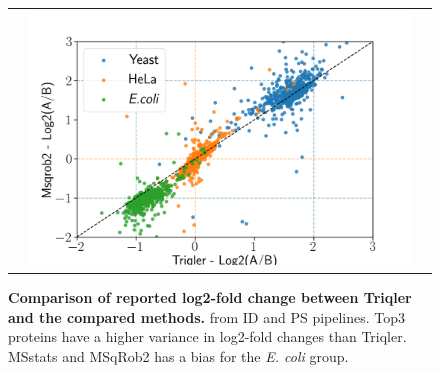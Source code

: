 \documentclass[11pt]{article}
\begin{document}
\begin{figure}[hbt]
\begin{tabular}{   >{\centering\arraybackslash} m{3cm} V V}
                & \includegraphics[width=\linewidth]{../../result/report_plots_pipeline/scatter_PS_triqler_vs_msqrob2.png} \\ 
    \end{tabular}
    \caption{{\bf Comparison of reported log2-fold change between Triqler and the compared methods.} from ID and PS pipelines. Top3 proteins have a higher variance in log2-fold changes than Triqler. MSstats and MSqRob2 has a bias for the \textit{E. coli} group. \label{fig:fc_scatter_triqler_vs_method_supplement}}
   
\end{figure}
\end{document}
